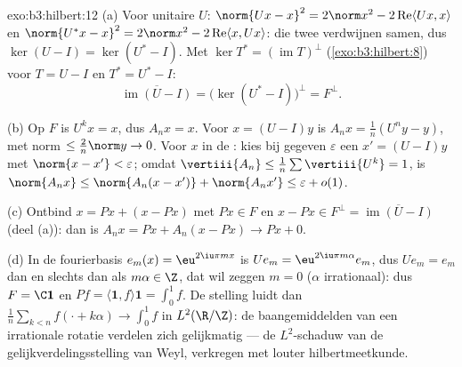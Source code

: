 \begin{solution}{exo:b3:hilbert:12}
(a) Voor unitaire $U$: $\norm{Ux - x}^2 = 2\norm x^2 -
2\operatorname{Re}\langle Ux, x\rangle$ en $\norm{U^*x - x}^2 =
2\norm x^2 - 2\operatorname{Re}\langle x, Ux\rangle$: die twee
verdwijnen samen, dus $\ker(U - I) = \ker(U^* - I)$. Met $\ker
T^* = (\operatorname{im}T)^\perp$ (\cref{exo:b3:hilbert:8}) voor
$T = U - I$ en $T^* = U^* - I$:
\[
\overline{\operatorname{im}(U - I)} = \bigl(\ker(U^* -
I)\bigr)^\perp = F^\perp .
\]

(b) Op $F$ is $U^kx = x$, dus $A_nx = x$. Voor $x = (U - I)y$ is
$A_nx = \frac1n(U^ny - y)$, met norm $\leq \frac2n\norm y \to 0$.
Voor $x$ in de : kies bij gegeven $\varepsilon$ een $x'
= (U - I)y$ met $\norm{x - x'} < \varepsilon$; omdat
$\vertiii{A_n} \leq \frac1n\sum\vertiii{U^k} = 1$, is
$\norm{A_nx} \leq \norm{A_n(x - x')} + \norm{A_nx'} \leq
\varepsilon + o(1)$.

(c) Ontbind $x = Px + (x - Px)$ met $Px \in F$ en $x - Px \in
F^\perp = \overline{\operatorname{im}(U - I)}$ (deel (a)): dan is
$A_nx = Px + A_n(x - Px) \to Px + 0$.

(d) In de fourierbasis $e_m(x) = \eu^{2\iu\pi mx}$ is $Ue_m =
\eu^{2\iu\pi m\alpha}e_m$, dus $Ue_m = e_m$ dan en slechts dan
als $m\alpha \in \Z$, dat wil zeggen $m = 0$ ($\alpha$
irrationaal): dus $F = \C\mathbf 1$ en $Pf = \langle\mathbf 1,
f\rangle\mathbf 1 = \int_0^1f$. De stelling luidt dan
$\frac1n\sum_{k<n}f(\cdot + k\alpha) \to \int_0^1f$ in
$L^2(\R/\Z)$: de baangemiddelden van een irrationale rotatie
verdelen zich gelijkmatig --- de $L^2$-schaduw van de
gelijkverdelingsstelling van Weyl, verkregen met louter
hilbertmeetkunde.
\end{solution}

